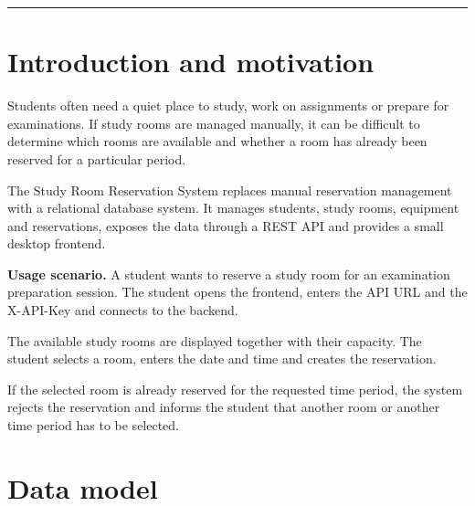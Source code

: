 \documentclass[10pt,a4paper]{article}
\begin{document}
	\vspace{1mm}
	
	\textcolor{THGABlue}{\rule{\textwidth}{0.7pt}}
	
	\vspace{2mm}
	
	\tableofcontents
	
	\newpage
	
	
	
	\section{Introduction and motivation}
	
	Students often need a quiet place to study, work on assignments or
	prepare for examinations. If study rooms are managed manually, it
	can be difficult to determine which rooms are available and whether
	a room has already been reserved for a particular period.
	
	The Study Room Reservation System replaces manual reservation
	management with a relational database system. It manages students,
	study rooms, equipment and reservations, exposes the data through a
	REST API and provides a small desktop frontend.
	
	\begin{greenbox}
		
		\textbf{Usage scenario.}
		A student wants to reserve a study room for an examination
		preparation session. The student opens the frontend, enters the API
		URL and the X-API-Key and connects to the backend.
		
		The available study rooms are displayed together with their
		capacity. The student selects a room, enters the date and time and
		creates the reservation.
		
		If the selected room is already reserved for the requested time
		period, the system rejects the reservation and informs the student
		that another room or another time period has to be selected.
		
	\end{greenbox}
	
	
	
	\section{Data model}
	
\end{document}
